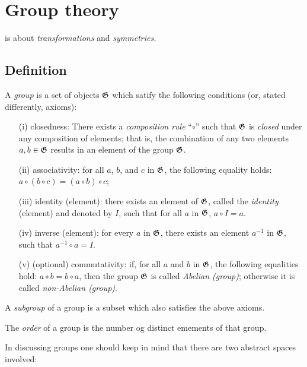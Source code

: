 \chapter{Group theory}
\label{2012-m-ch-gt}

 is about {\em transformations} and {\em symmetries.}

\section{Definition}

A {\em group} is a set of objects ${\frak G}$ which satify   the following conditions (or, stated differently, axioms):

\begin{itemize}
\item[(i)] closedness:
There exists a {\em composition rule} ``$\circ$'' such that ${\frak G}$ is {\em closed} under any composition
of elements; that is, the combination of any two elements
$a,b \in {\frak G}$ results in an element of the group ${\frak G}$.
\item[(ii)]
associativity:
for all $a$, $b$, and $c$ in ${\frak G}$,
the following equality holds: $a \circ (b \circ c) = (a \circ b) \circ c$;
\item[(iii)]
identity (element):
there exists an element of ${\frak G}$,
called the  {\em identity} (element) and denoted by $I$, such that for all $a$ in ${\frak G}$,
$a \circ I = a$.
\item[(iv)]
inverse (element):
for every $a$ in ${\frak G}$, there exists an element $a^{-1}$ in ${\frak G}$, such that $a^{-1} \circ  a  = I$.
\item[(v)]
(optional) commutativity:
if, for all $a$ and $b$ in ${\frak G}$, the following equalities hold: $a \circ b = b \circ a$,
then the group ${\frak G}$ is called {\em Abelian (group)}; otherwise it is called {\em non-Abelian (group)}.
\end{itemize}

A {\em subgroup} of a group is a subset which also satisfies the above axioms.


The {\em order} of a group is the number og distinct emements of that group.

In discussing groups one should keep in mind that there are two abstract spaces involved:

